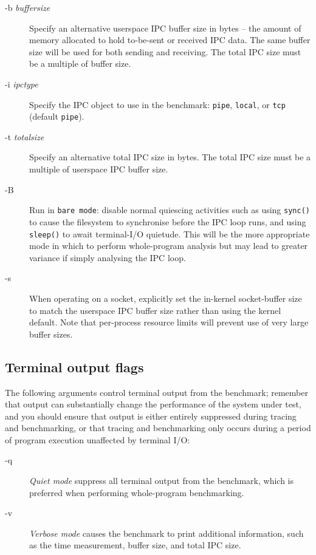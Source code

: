 \documentclass[a4paper,10pt]{article}
\begin{document}
\begin{description}
\item[-b \textit{buffersize}] Specify an alternative userspace IPC buffer size
  in bytes -- the amount of memory allocated to hold to-be-sent or received
  IPC data.
  The same buffer size will be used for both sending and receiving.
  The total IPC size must be a multiple of buffer size.

\item[-i \textit{ipctype}] Specify the IPC object to use in the benchmark:
	\texttt{pipe}, \texttt{local}, or \texttt{tcp} (default \texttt{pipe}).

\item[-t \textit{totalsize}] Specify an alternative total IPC size in bytes.
  The total IPC size must be a multiple of userspace IPC buffer size.

\item[-B] Run in \texttt{bare mode}: disable normal quiescing activities such
  as using \texttt{sync()} to cause the filesystem to synchronise before the
  IPC loop runs, and using \texttt{sleep()} to await terminal-I/O quietude.
  This will be the more appropriate mode in which to perform whole-program
  analysis but may lead to greater variance if simply analysing the IPC loop.

\item[-s] When operating on a socket, explicitly set the in-kernel
  socket-buffer size to match the userspace IPC buffer size rather than using
  the kernel default.
  Note that per-process resource limits will prevent use of very large buffer
  sizes.
\end{description}

\subsection*{Terminal output flags}

\noindent
The following arguments control terminal output from the benchmark; remember
that output can substantially change the performance of the system under test,
and you should ensure that output is either entirely suppressed during tracing
and benchmarking, or that tracing and benchmarking only occurs during a period
of program execution unaffected by terminal I/O:

\begin{description}
\item[-q] \textit{Quiet mode} suppress all terminal output from the benchmark,
  which is preferred when performing whole-program benchmarking.

\item[-v] \textit{Verbose mode} causes the benchmark to print additional
  information, such as the time measurement, buffer size, and total IPC size.
\end{description}
\end{document}
